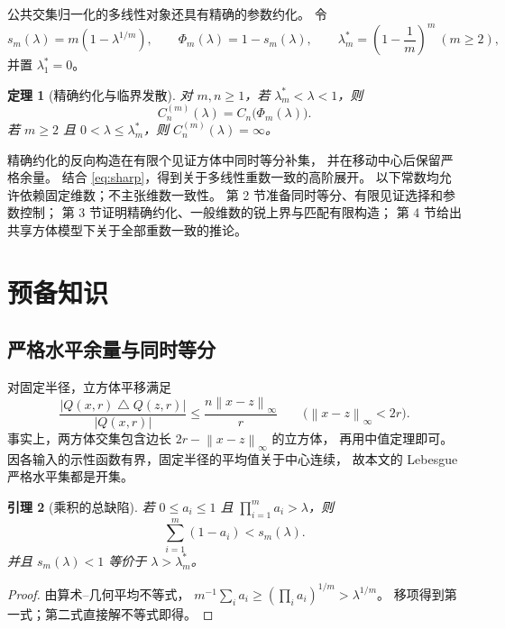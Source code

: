 \documentclass[UTF8,11pt,fontset=none]{ctexart}
\newtheorem{theorem}{定理}[section]
\newtheorem{lemma}[theorem]{引理}
\theoremstyle{remark}
\newcommand{\Cn}{C_n}
\newcommand{\Cm}{C_n^{(m)}}
\newcommand{\norm}[1]{\left\lVert#1\right\rVert}
\begin{document}
公共交集归一化的多线性对象还具有精确的参数约化。
令
\[
 s_m(\lambda)=m(1-\lambda^{1/m}),\qquad
 \Phi_m(\lambda)=1-s_m(\lambda),\qquad
 \lambda_m^*=\left(1-\frac1m\right)^m\ (m\ge2),
\]
并置 \(\lambda_1^*=0\)。
\begin{theorem}[精确约化与临界发散]\label{thm:reduction}
对 \(m,n\ge1\)，若 \(\lambda_m^*<\lambda<1\)，则
\begin{equation}\label{eq:reduction}
 \Cm(\lambda)=\Cn\bigl(\Phi_m(\lambda)\bigr).
\end{equation}
若 \(m\ge2\) 且 \(0<\lambda\le\lambda_m^*\)，则
\(\Cm(\lambda)=\infty\)。
\end{theorem}

精确约化的反向构造在有限个见证方体中同时等分补集，
并在移动中心后保留严格余量。
结合 \eqref{eq:sharp}，得到关于多线性重数一致的高阶展开。
以下常数均允许依赖固定维数；不主张维数一致性。
第 2 节准备同时等分、有限见证选择和参数控制；
第 3 节证明精确约化、一般维数的锐上界与匹配有限构造；
第 4 节给出共享方体模型下关于全部重数一致的推论。

\section{预备知识}
\subsection{严格水平余量与同时等分}

对固定半径，立方体平移满足
\begin{equation}\label{eq:translation}
 \frac{|Q(x,r)\mathbin\triangle Q(z,r)|}{|Q(x,r)|}
 \le\frac{n\norm{x-z}_\infty}{r}
 \qquad\bigl(\norm{x-z}_\infty<2r\bigr).
\end{equation}
事实上，两方体交集包含边长 \(2r-\norm{x-z}_\infty\) 的立方体，
再用中值定理即可。因各输入的示性函数有界，固定半径的平均值关于中心连续，
故本文的 Lebesgue 严格水平集都是开集。

\begin{lemma}[乘积的总缺陷]\label{lem:defect}
若 \(0\le a_i\le1\) 且 \(\prod_{i=1}^ma_i>\lambda\)，则
\[
 \sum_{i=1}^m(1-a_i)<s_m(\lambda).
\]
并且 \(s_m(\lambda)<1\) 等价于 \(\lambda>\lambda_m^*\)。
\end{lemma}
\begin{proof}
由算术--几何平均不等式，
\(m^{-1}\sum_i a_i\ge(\prod_i a_i)^{1/m}>\lambda^{1/m}\)。
移项得到第一式；第二式直接解不等式即得。
\end{proof}
\end{document}
